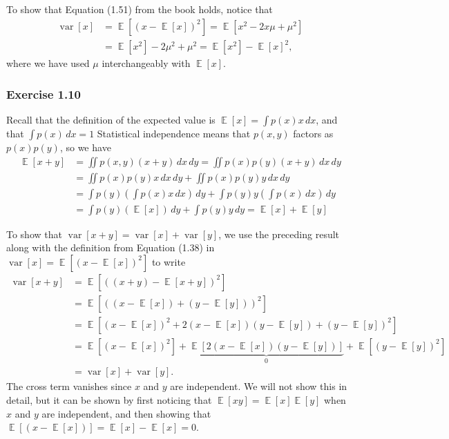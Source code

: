 \documentclass[12pt, a4paper]{article}
\DeclareMathOperator{\E}{\mathbb{E}}
\DeclareMathOperator{\var}{\operatorname{var}}
\begin{document}
To show that Equation (1.51) from the book holds, notice that
\begin{align*}
	\var \left[ x \right] &= \E\left[ (x - \E\left[x\right])^2\right] 
	= \E\left[ x^2 - 2 x \mu + \mu ^2\right] \\
	&= \E\left[ x^2\right] - 2 \mu^2 + \mu^2 
	= \E\left[ x^2\right] - \E\left[ x\right]^2,
\end{align*}
where we have used $\mu$ interchangeably with $\E\left[ x\right]$. 



\subsubsection*{Exercise 1.10}
Recall that the definition of the expected value is
$\E\left[x\right] = \int p(x) x \, dx$, and that $\int p(x) \, dx = 1$
Statistical independence means that $p(x, y)$ factors as $p(x)p(y)$, so we have
\begin{align*}
	\E\left[x + y\right] &= \iint p(x, y) (x+y) \, dx \, dy 
	= \iint p(x) p(y) (x+y) \, dx \, dy \tag{independence} \\
	&= \iint p(x) p(y) x \, dx \, dy + \iint p(x) p(y) y \, dx \, dy \\
	&= \int p(y) \left( \int  p(x)  x \, dx \right) \, dy + \int p(y) y \left( \int p(x)  \, dx \right) \, dy \\
	&= \int p(y) \left( \E \left[ x \right] \right) \, dy + \int p(y) y \, dy \tag{by definition} 
	= \E\left[x\right] + \E\left[y\right]
\end{align*}

To show that $\var\left[x + y\right] = \var\left[x\right] + \var\left[y\right]$, we use the preceding result along with the definition from Equation (1.38) in \cite{bishop_pattern_2011}  $\var\left[x\right] = \E\left[ (x - \E\left[x\right])^2\right]$ to write
\begin{align*}
	\var\left[x + y\right] &= \E\left[ \left( (x + y) - \E \left[ x + y \right] \right)^2\right] \\
	&= \E\left[ \left( \left(x - \E\left[x\right]\right) + \left(y - \E\left[y\right]\right) \right)^2\right] \tag{rearranging} \\
	&= \E\left[  \left(x - \E\left[x\right]\right)^2 + 2 \left(x - \E\left[x\right]\right) \left(y - \E\left[y\right]\right) + \left(y - \E\left[y\right]\right)^2\right] \\
	&= \E\left[  \left(x - \E\left[x\right]\right)^2 \right]
	+
	\underbrace{\E\left[   2 \left(x - \E\left[x\right]\right) \left(y - \E\left[y\right]\right) \right]}_{0}
	+
	\E\left[   \left(y - \E\left[y\right]\right)^2\right] \\
	&= \var\left[x\right] + \var\left[y\right].
\end{align*}
The cross term vanishes since $x$ and $y$ are independent.
We will not show this in detail, but it can be shown by first noticing that $\E \left[xy\right] = \E \left[x\right] \E \left[y\right]$ when $x$ and $y$ are independent, and then showing that $\E\left[    \left(x - \E\left[x\right]\right) \right] = \E\left[ x \right] - \E\left[ x \right] = 0$.
\end{document}
